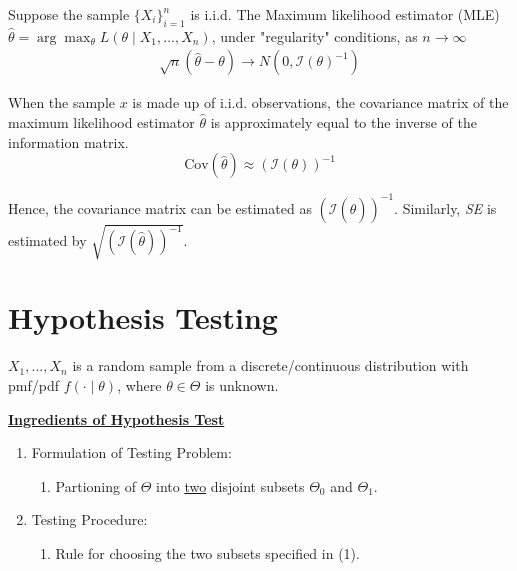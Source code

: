 \documentclass[11pt]{elegantbook}
\begin{document}
\begin{theorem}
    Suppose the sample $\{X_i\}_{i=1}^n$ is i.i.d. The Maximum likelihood estimator (MLE) $\hat{\theta}=\arg\max_\theta L(\theta\mid X_1,...,X_n)$, under "regularity" conditions, as $n \rightarrow \infty$
    \begin{equation}
        \begin{aligned}
            \sqrt{n}\left(\hat{\theta}-\theta\right) \rightarrow N(0,\mathcal{I}(\theta)^{-1})
        \end{aligned}
        \nonumber
    \end{equation}
\end{theorem}
\begin{proposition}
    When the sample $x$ is made up of i.i.d. observations, the covariance matrix of the maximum likelihood estimator $\hat{\theta}$ is approximately equal to the inverse of the information matrix. $$\text{Cov}(\hat{\theta})\approx(\mathcal{I}(\theta))^{-1}$$
\end{proposition}
Hence, the covariance matrix can be estimated as $(\mathcal{I}(\hat{\theta}))^{-1}$. Similarly, \textit{SE} is estimated by $\sqrt{(\mathcal{I}(\hat{\theta}))^{-1}}$.


\section{Hypothesis Testing}
$X_1,...,X_n$ is a random sample from a discrete/continuous distribution with pmf/pdf $f(\cdot\mid \theta)$, where $\theta\in\Theta$ is unknown.

\textbf{\underline{Ingredients of Hypothesis Test}}
\begin{enumerate}[(1).]
    \item Formulation of Testing Problem:
    \begin{enumerate}[$\circ$]
        \item Partioning of $\Theta$ into \underline{two} disjoint subsets $\Theta_0$ and $\Theta_1$.
    \end{enumerate}
    \item Testing Procedure:
    \begin{enumerate}[$\circ$]
        \item Rule for choosing the two subsets specified in (1).
    \end{enumerate}
\end{enumerate}
\end{document}
